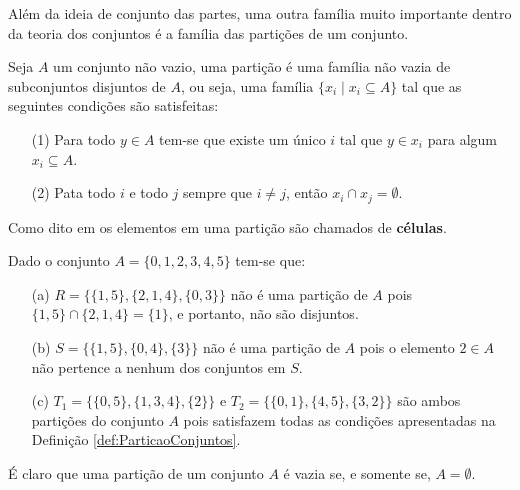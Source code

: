 Além da ideia de conjunto das partes, uma outra família muito importante dentro da teoria dos conjuntos é a família das partições de um conjunto.

\begin{definition}[Partição]\label{def:ParticaoConjuntos}
	Seja $A$ um conjunto não vazio, uma partição é uma família não vazia de subconjuntos disjuntos de $A$, ou seja, uma família $\{x_i \mid x_i \subseteq A\}$ tal que as seguintes condições são satisfeitas:
	\begin{itemize}
		\item[(1)] Para todo $y \in A$ tem-se que existe um único $i$ tal que $y \in x_i$ para algum $x_i \subseteq A$.
		\item[(2)] Pata todo $i$ e todo $j$ sempre que $i \neq j$, então $x_i \cap x_j = \emptyset$.
	\end{itemize}
\end{definition} 

Como dito em \cite{lipschutz2013-MD} os elementos em uma partição são chamados de \textbf{células}.

\begin{example}
	Dado o conjunto $A = \{0, 1, 2, 3, 4, 5\}$ tem-se que:
	\begin{itemize}
		\item[(a)] $R = \{\{1, 5\}, \{2, 1, 4\}, \{0, 3\}\}$ não é uma partição de $A$ pois $\{1, 5\} \cap \{2, 1, 4\} = \{1\}$, e portanto, não são disjuntos.
		\item[(b)] $S = \{\{1, 5\}, \{0, 4\}, \{3\}\}$ não é uma partição de $A$ pois o elemento $2 \in A$ não pertence a nenhum dos conjuntos em $S$.
		\item[(c)] $T_1 = \{\{0, 5\}, \{1, 3, 4\}, \{2\}\}$ e $T_2 = \{\{0, 1\}, \{4, 5\}, \{3, 2\}\}$ são ambos partições do conjunto $A$ pois satisfazem todas as condições apresentadas na Definição \ref{def:ParticaoConjuntos}.
	\end{itemize}
\end{example}

\begin{remark}
	É claro que uma partição de um conjunto $A$ é vazia se, e somente se, $A = \emptyset$.
\end{remark}

